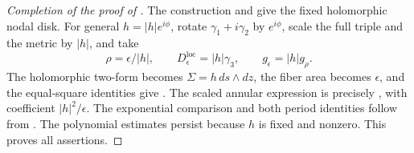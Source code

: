 \begin{proof}[Completion of the proof of ]
The construction and  give the
fixed holomorphic nodal disk.  For general \(h=|h|e^{i\phi}\),
rotate \(\gamma_1+i\gamma_2\) by \(e^{i\phi}\), scale the full
triple and the metric by \(|h|\), and take
\[
 \rho=\epsilon/|h|,\qquad
 D^{\mathrm{loc}}_\epsilon=|h|\gamma_3,\qquad
 g_\epsilon=|h|g_\rho.
\]
The holomorphic two-form becomes \(\Sigma=h\,ds\wedge dz\), the fiber area
becomes \(\epsilon\), and the equal-square identities give
.  The scaled annular expression
is precisely , with coefficient
\(|h|^2/\epsilon\).  The exponential comparison and both period
identities follow from
.
The polynomial estimates persist because \(h\) is fixed and
nonzero.  This proves all assertions.
\end{proof}
